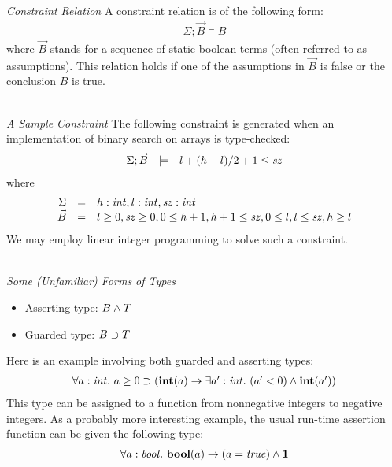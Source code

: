 \documentclass[pdf]{prosper}
\begin{document}
\def\vB{\vec{B}}
\def\temd{\models}
\begin{slide}{\em Constraint Relation}
A constraint relation is of the following form:
\[\begin{array}{c}
\Sigma;\vB\temd B
\end{array}\]
where $\vB$ stands for a sequence of static boolean terms
(often referred to as assumptions). This relation holds if
one of the assumptions in $\vB$ is false or the conclusion $B$
is true.\\~\\
\end{slide}
\begin{slide}{\em A Sample Constraint}
\def\sz{{\it sz}}
The following constraint is generated when an
implementation of binary search on arrays is type-checked:
\[\begin{array}{rcl}
\Sigma;\vB & \temd & l+(h-l)/2+1\leq \sz \\
\end{array}\]
where
\[\begin{array}{rcl}
\Sigma & = & h:\sint, l:\sint, \sz:\sint \\
\vB & = & l\geq 0, \sz\geq 0, 0\leq h+1, h+1\leq \sz, 0\leq l, l\leq \sz, h\geq l \\
\end{array}\]
We may employ linear integer programming to solve such a constraint.\\~\\
\end{slide}
\begin{slide}{\em Some (Unfamiliar) Forms of Types}
\begin{itemize}
\item Asserting type: $B\land T$
\item Guarded type: $B\supset T$
\end{itemize}
Here is an example involving both guarded and asserting types:
\[\begin{array}{l}
\forall a:{\it int}.~a \geq 0\supset (\mbox{\bf int} (a) \rightarrow \exists a':{\it int}.~(a'<0)\land \mbox{\bf int}(a')) \\
\end{array}\]
This type can be assigned to a function from nonnegative integers to
negative integers. As a probably more interesting example, the usual
run-time assertion function can be given the following type:
\[\begin{array}{l}
\forall a:{\it bool}.~\mbox{\bf bool}(a)\rightarrow(a={\it true})\land{\mathbf 1} \\
\end{array}\]
\vfill
\end{slide}
\end{document}
